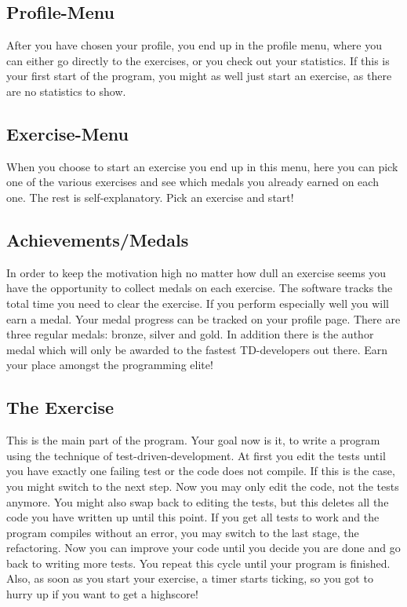 \documentclass[10pt,a4paper]{article}
\begin{document}
\subsection{Profile-Menu}
After you have chosen your profile, you end up in the profile menu, where you can either go directly to the exercises, or you check out your statistics. If this is your first start of the program, you might as well just start an exercise, as there are no statistics to show.
\subsection{Exercise-Menu}
When you choose to start an exercise you end up in this menu, here you can pick one of the various exercises and see which medals you already earned on each one.
The rest is self-explanatory. Pick an exercise and start!
\subsection{Achievements/Medals}
In order to keep the motivation high no matter how dull an exercise seems you have the opportunity to collect medals on each exercise. The software tracks the total time you need to clear the exercise. If you perform especially well you will earn
a medal. Your medal progress can be tracked on your profile page.
There are three regular medals: bronze, silver and gold. In addition there is the author medal which will only be awarded to the fastest TD-developers out there.
Earn your place amongst the programming elite!
\subsection{The Exercise}
This is the main part of the program. Your goal now is it, to write a program using the technique of test-driven-development.
At first you edit the tests until you have exactly one failing test or the code does not compile. If this is the case, you might switch to the next step.
Now you may only edit the code, not the tests anymore. You might also swap back to editing the tests, but this deletes all the code you have written up until this point. If you get all tests to work and the program compiles without an error, you may switch to the last stage, the refactoring. Now you can improve your code until you decide you are done and go back to writing more tests. You repeat this cycle until your program is finished.
Also, as soon as you start your exercise, a timer starts ticking, so you got to hurry up if you want to get a highscore!
\end{document}
